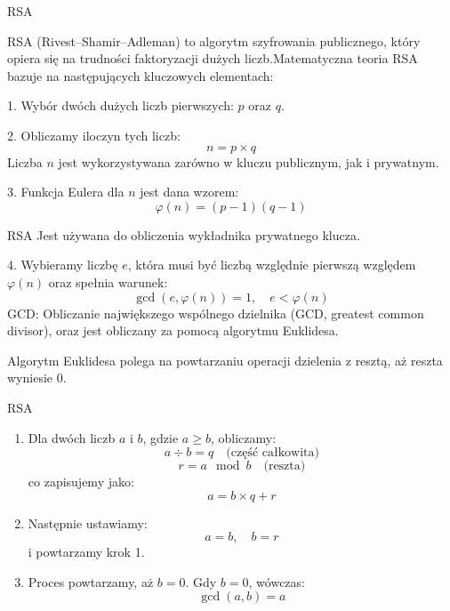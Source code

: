 

\begin{frame}{RSA}
    
    RSA (Rivest–Shamir–Adleman) to algorytm szyfrowania publicznego, który opiera się na trudności faktoryzacji dużych liczb.Matematyczna teoria RSA bazuje na następujących kluczowych elementach:

   1. Wybór dwóch dużych liczb pierwszych: \( p \) oraz \( q \).

   
    2. Obliczamy iloczyn tych liczb:
    \[
    n = p \times q
    \]
    Liczba \( n \) jest wykorzystywana zarówno w kluczu publicznym, jak i prywatnym.

    
    3. Funkcja Eulera dla \( n \) jest dana wzorem:
    \[
    \varphi(n) = (p-1)(q-1)
    \]

\end{frame}

\begin{frame}{RSA}
    Jest używana do obliczenia wykładnika prywatnego klucza.

    4. Wybieramy liczbę \( e \), która musi być liczbą względnie pierwszą względem \(\varphi(n)\) oraz spełnia warunek:
    \[
    \gcd(e, \varphi(n)) = 1, \quad e < \varphi(n)
    \]
    GCD: Obliczanie największego wspólnego dzielnika (GCD, greatest common divisor), oraz jest obliczany za pomocą algorytmu Euklidesa.

   
    Algorytm Euklidesa polega na powtarzaniu operacji dzielenia z resztą, aż reszta wyniesie 0.
\end{frame}

\begin{frame}{RSA}




    \begin{enumerate}
        \item Dla dwóch liczb \( a \) i \( b \), gdzie \( a \geq b \), obliczamy:
        \[
        a \div b = q \quad \text{(część całkowita)}
        \]
        \[
        r = a \mod b \quad \text{(reszta)}
        \]
        co zapisujemy jako:
        \[
        a = b \times q + r
        \]

        \item Następnie ustawiamy:
        \[
        a = b, \quad b = r
        \]
        i powtarzamy krok 1.

        \item Proces powtarzamy, aż \( b = 0 \). Gdy \( b = 0 \), wówczas:
        \[
        \gcd(a, b) = a
        \]
    \end{enumerate}



\end{frame}

